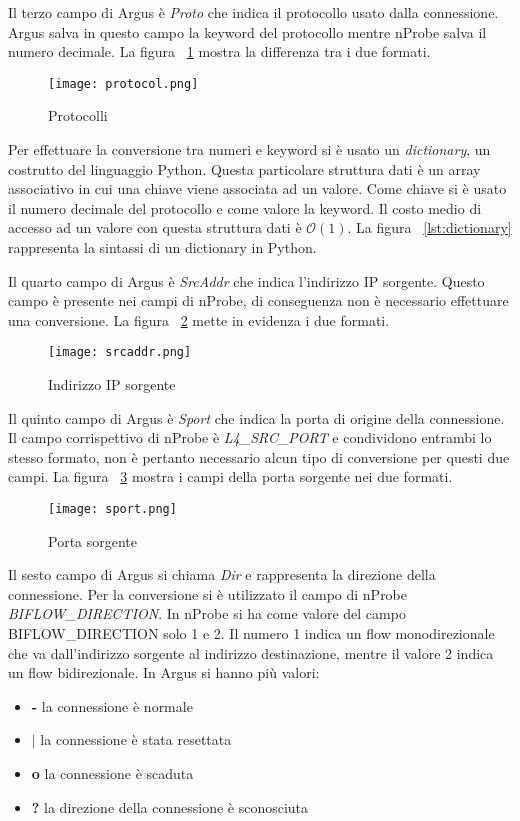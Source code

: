 \documentclass[../main.tex]{subfiles}
\begin{document}
Il terzo campo di Argus è \textit{Proto} che indica il protocollo usato dalla connessione. Argus salva in questo campo la keyword del protocollo mentre nProbe salva il numero decimale. La figura ~\ref{fig:protocol} mostra la differenza tra i due formati.
\begin{figure}[H]
				\centering
\texttt{[image: protocol.png]}
				\caption{Protocolli}
				\label{fig:protocol}
\end{figure}
Per effettuare la conversione tra numeri e keyword si è usato un \textit{dictionary}, un costrutto del linguaggio Python. Questa particolare struttura dati è un array associativo in cui una chiave viene associata ad un valore. Come chiave si è usato il numero decimale del protocollo e come valore la keyword. Il costo medio di accesso ad un valore con questa struttura dati è $\mathcal{O}(1)$. La figura ~\ref{lst:dictionary} rappresenta la sintassi di un dictionary in Python.


Il quarto campo di Argus è \textit{SrcAddr} che indica l'indirizzo IP sorgente. Questo campo è presente nei campi di nProbe, di conseguenza non è necessario effettuare una conversione. La figura ~\ref{fig:srcaddr} mette in evidenza i due formati.
\begin{figure}[H]
				\centering
\texttt{[image: srcaddr.png]}
				\caption{Indirizzo IP sorgente}
				\label{fig:srcaddr}
\end{figure}

Il quinto campo di Argus è \textit{Sport} che indica la porta di origine della connessione. Il campo corrispettivo di nProbe è \textit{L4\_SRC\_PORT} e condividono entrambi lo stesso formato, non è pertanto necessario alcun tipo di conversione per questi due campi. La figura ~\ref{fig:sport} mostra i campi della porta sorgente nei due formati.
\begin{figure}[H]
				\centering
\texttt{[image: sport.png]}
				\caption{Porta sorgente}
				\label{fig:sport}
\end{figure}

Il sesto campo di Argus si chiama \textit{Dir} e rappresenta la direzione della connessione. Per la conversione si è utilizzato il campo di nProbe \textit{BIFLOW\_DIRECTION}. In nProbe si ha come valore del campo BIFLOW\_DIRECTION solo 1 e 2. Il numero 1 indica un flow monodirezionale che va dall'indirizzo sorgente al indirizzo destinazione, mentre il valore 2 indica un flow bidirezionale. In Argus si hanno più valori:
\begin{itemize}
				\item \textbf{-} la connessione è normale
				\item $\boldsymbol|$ la connessione è stata resettata
				\item \textbf{o} la connessione è scaduta
				\item \textbf{?} la direzione della connessione è sconosciuta
\end{itemize}
\end{document}
